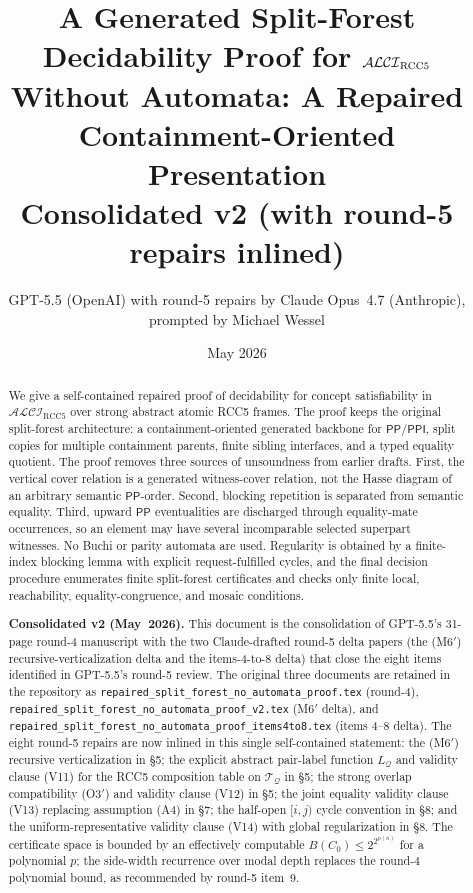 \documentclass[11pt]{article}
\title{A Generated Split-Forest Decidability Proof for $\Logic$\\
       Without Automata: A Repaired Containment-Oriented Presentation\\[4pt]
       \large Consolidated v2 (with round-5 repairs inlined)}
\author{GPT-5.5 (OpenAI) with round-5 repairs by Claude Opus~4.7 (Anthropic),\\
prompted by Michael Wessel}
\date{May 2026}
\newcommand{\Logic}{\mathcal{ALCI}_{\mathrm{RCC5}}}
\newcommand{\PP}{\mathsf{PP}}
\newcommand{\PPI}{\mathsf{PPI}}
\newcommand{\Q}{\mathcal Q}
\newcommand{\T}{\mathcal T}
\begin{document}
\maketitle

\begin{abstract}
We give a self-contained repaired proof of decidability for concept
satisfiability in $\Logic$ over strong abstract atomic RCC5 frames.
The proof keeps the original split-forest architecture: a
containment-oriented generated backbone for $\PP/\PPI$, split copies
for multiple containment parents, finite sibling interfaces, and a
typed equality quotient.  The proof removes three sources of
unsoundness from earlier drafts.  First, the vertical cover relation
is a generated witness-cover relation, not the Hasse diagram of an
arbitrary semantic $\PP$-order.  Second, blocking repetition is
separated from semantic equality.  Third, upward $\PP$ eventualities
are discharged through equality-mate occurrences, so an element may
have several incomparable selected superpart witnesses.  No Buchi or
parity automata are used.  Regularity is obtained by a finite-index
blocking lemma with explicit request-fulfilled cycles, and the final
decision procedure enumerates finite split-forest certificates and
checks only finite local, reachability, equality-congruence, and
mosaic conditions.

\medskip\noindent
\textbf{Consolidated v2 (May~2026).}  This document is the
consolidation of GPT-5.5's 31-page round-4 manuscript with the two
Claude-drafted round-5 delta papers (the (M6$'$) recursive-verticalization
delta and the items-4-to-8 delta) that close the eight items
identified in GPT-5.5's round-5 review.  The original three
documents are retained in the repository as
\texttt{repaired\_split\_forest\_no\_automata\_proof.tex} (round-4),
\texttt{repaired\_split\_forest\_no\_automata\_proof\_v2.tex} (M6$'$
delta), and
\texttt{repaired\_split\_forest\_no\_automata\_proof\_items4to8.tex}
(items 4--8 delta).  The eight round-5 repairs are now inlined in
this single self-contained statement: the (M6$'$) recursive
verticalization in \S5; the explicit abstract pair-label function
$L_\Q$ and validity clause (V11) for the RCC5 composition table on
$\T_\Q$ in \S5; the strong overlap compatibility (O3$'$) and
validity clause (V12) in \S5; the joint equality validity clause
(V13) replacing assumption (A4) in \S7; the half-open $[i,j)$ cycle
convention in \S8; and the uniform-representative validity clause
(V14) with global regularization in \S8.  The certificate space is
bounded by an effectively computable $B(C_0)\le 2^{2^{p(n)}}$ for
a polynomial $p$; the side-width recurrence over modal depth
replaces the round-4 polynomial bound, as recommended by round-5
item~9.
\end{abstract}
\end{document}
